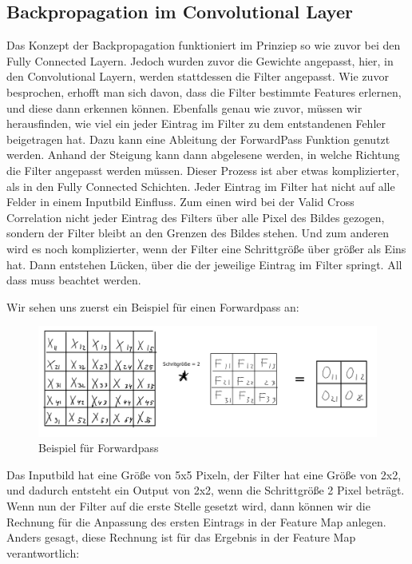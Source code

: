 \documentclass[12pt]{article}
\begin{document}
\subsection{Backpropagation im Convolutional Layer}
Das Konzept der Backpropagation funktioniert im Prinziep so wie zuvor bei den Fully Connected Layern. Jedoch wurden zuvor die Gewichte angepasst, hier, in den Convolutional Layern, werden stattdessen die Filter angepasst. Wie zuvor besprochen, erhofft man sich davon, dass die Filter bestimmte Features erlernen, und diese dann erkennen können.
Ebenfalls genau wie zuvor, müssen wir herausfinden, wie viel ein jeder Eintrag im Filter zu dem entstandenen Fehler beigetragen hat. Dazu kann eine Ableitung der ForwardPass Funktion genutzt werden. Anhand der Steigung kann dann abgelesene werden, in welche Richtung die Filter angepasst werden müssen. Dieser Prozess ist aber etwas komplizierter, als in den Fully Connected Schichten. Jeder Eintrag im Filter hat nicht auf alle Felder in einem Inputbild Einfluss. Zum einen wird bei der Valid Cross Correlation nicht jeder Eintrag des Filters über alle Pixel des Bildes gezogen, sondern der Filter bleibt an den Grenzen des Bildes stehen. Und zum anderen wird es noch komplizierter, wenn der Filter eine Schrittgröße über größer als Eins hat. Dann entstehen Lücken, über die der jeweilige Eintrag im Filter springt. All dass muss beachtet werden. 

Wir sehen uns zuerst ein Beispiel für einen Forwardpass an:
\begin{figure}[H]
\centering
\includegraphics[scale=0.27]{Images/010_ForwardPassConvolution.png}
\caption{Beispiel für Forwardpass}
\label{Beispiel für Forwardpass}
\end{figure}

Das Inputbild hat eine Größe von 5x5 Pixeln, der Filter hat eine Größe von 2x2, und dadurch entsteht ein Output von 2x2, wenn die Schrittgröße 2 Pixel beträgt. 
Wenn nun der Filter auf die erste Stelle gesetzt wird, dann können wir die Rechnung für die Anpassung des ersten Eintrags in der Feature Map anlegen. Anders gesagt, diese Rechnung ist für das Ergebnis in der Feature Map verantwortlich:
\end{document}
